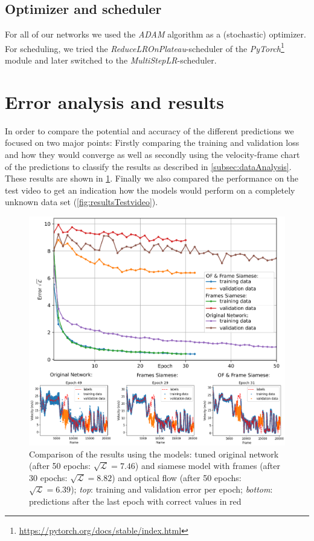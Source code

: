 \documentclass[conference]{IEEEtran}
\begin{document}
\subsection{Optimizer and scheduler}
For all of our networks we used the \emph{ADAM} \cite{Adam2014} algorithm as a (stochastic) optimizer. 
For scheduling, we tried the \emph{ReduceLROnPlateau}-scheduler of the \emph{PyTorch}\footnote{
\url{https://pytorch.org/docs/stable/index.html}} module and later
switched to the \emph{MultiStepLR}-scheduler.

\section{Error analysis and results}
In order to compare the potential and accuracy of the different predictions we focused on two major points: Firstly comparing the training and validation loss and how they would converge as well as secondly using the velocity-frame chart of the predictions to classify the results as described in \cref{subsec:dataAnalysis}. These results are shown in \cref{fig:resultsSummary}. Finally we also compared the performance on the test video to get an indication how the models would perform on a completely unknown data set (\cref{fig:resultsTestvideo}).

\begin{figure}[ht]
	\centering
	\includegraphics[width=0.99\columnwidth]{imgs/TrainingProcess.eps}
	\caption{Comparison of the results using the models: tuned original network (after 50 epochs: $\sqrt{\mathcal{L}} = 7.46$) and siamese model with frames (after 30 epochs: $\sqrt{\mathcal{L}} = 8.82$) and optical flow (after 50 epochs: $\sqrt{\mathcal{L}} = 6.39$); \textit{top}: training and validation error per epoch; 
	\emph{bottom}: predictions after the last epoch with correct values in red}
	\label{fig:resultsSummary}
\end{figure}
\end{document}
